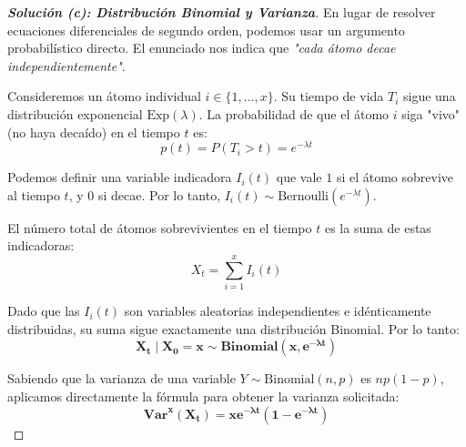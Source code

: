 \documentclass[10pt,a4paper]{article}
\begin{document}
\begin{proof}[\textbf{Solución (c): Distribución Binomial y Varianza}]
    En lugar de resolver ecuaciones diferenciales de segundo orden, podemos usar un argumento probabilístico directo. El enunciado nos indica que \textit{"cada átomo decae independientemente"}.
    
    Consideremos un átomo individual $i \in \{1, \dots, x\}$. Su tiempo de vida $T_i$ sigue una distribución exponencial $\text{Exp}(\lambda)$. 
    La probabilidad de que el átomo $i$ siga "vivo" (no haya decaído) en el tiempo $t$ es:
    \[ p(t) = P(T_i > t) = e^{-\lambda t} \]
    
    Podemos definir una variable indicadora $I_i(t)$ que vale $1$ si el átomo sobrevive al tiempo $t$, y $0$ si decae. Por lo tanto, $I_i(t) \sim \text{Bernoulli}(e^{-\lambda t})$.
    
    El número total de átomos sobrevivientes en el tiempo $t$ es la suma de estas indicadoras:
    \[ X_t = \sum_{i=1}^x I_i(t) \]
    
    Dado que las $I_i(t)$ son variables aleatorias independientes e idénticamente distribuidas, su suma sigue exactamente una distribución Binomial. Por lo tanto:
    \[ \mathbf{X_t \mid X_0 = x \sim \text{Binomial}(x, e^{-\lambda t})} \]
    
    Sabiendo que la varianza de una variable $Y \sim \text{Binomial}(n, p)$ es $np(1-p)$, aplicamos directamente la fórmula para obtener la varianza solicitada:
    \[ \mathbf{\text{Var}^x(X_t) = x e^{-\lambda t}(1 - e^{-\lambda t})} \]
\end{proof}

\vspace{5mm}
\end{document}
